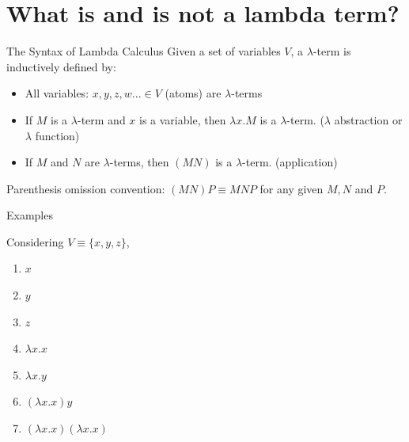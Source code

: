 \documentclass[aspectratio=169,10pt]{beamer}
\begin{document}
\section{What is and is not a lambda term?}

\begin{frame}{The Syntax of Lambda Calculus}
  Given a set of variables $V$, a  $\lambda$-term is inductively defined by:

  \begin{itemize}
    \item All variables: $x, y, z, w... \in V$ (atoms) are $\lambda$-terms
    \item If $M$ is a $\lambda$-term and $x$ is a variable, then $\lambda x.M$ is a $\lambda$-term. ($\lambda$ abstraction or $\lambda$ function)
    \item If $M$ and $N$ are $\lambda$-terms, then $(MN)$ is a $\lambda$-term. (application)
  \end{itemize}

  Parenthesis omission convention: $(MN)P \equiv MNP$ for any given $M, N$ and $P$.

  \pause

  \begin{block}{Examples}

    Considering $V \equiv \{x,y,z\}$,
    \begin{enumerate}
      \item $x$
      \item $y$
      \item $z$
      \item $\lambda x.x$
      \item $\lambda x.y$
      \item $(\lambda x.x)y$
      \item $(\lambda x.x)(\lambda x.x)$
    \end{enumerate}
  \end{block}
\end{frame}
\end{document}
